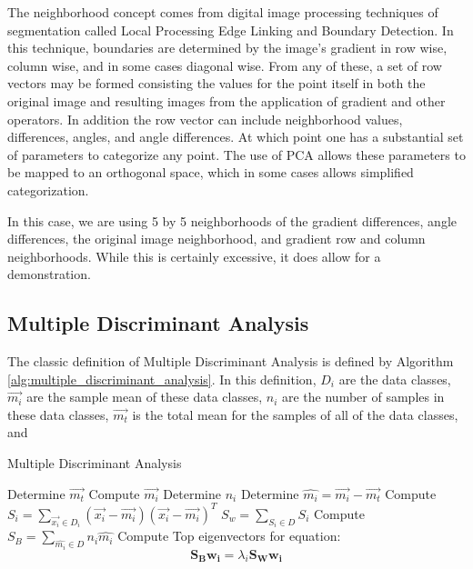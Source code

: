 \documentclass[12pt]{report}
\begin{document}
The neighborhood concept comes from digital image processing techniques of segmentation called Local Processing Edge Linking and Boundary Detection.   In this technique, boundaries are determined by the image's gradient in row wise, column wise, and in some cases diagonal wise.  From any of these, a set of row vectors may be formed consisting the values for the point itself in both the original image and resulting images from the application of gradient and other operators.  In addition the row vector can include neighborhood values, differences, angles, and angle differences.  At which point one has a substantial set of parameters to categorize any point.  The use of PCA allows these parameters to be mapped to an orthogonal space, which in some cases allows simplified categorization.  


In this case, we are using 5 by 5 neighborhoods of the gradient differences, angle differences, the original image neighborhood, and gradient row and column neighborhoods.   While this is certainly excessive, it does allow for a demonstration.   


\subsection{Multiple Discriminant Analysis}

The classic definition of Multiple Discriminant Analysis is defined by Algorithm \ref{alg:multiple_discriminant_analysis}.  In this definition, $D_i$ are the data classes, $\vec{m_i}$ are the sample mean of these data classes, $n_i$ are the number of samples in these data classes, $\vec{m_t}$ is the total mean for the samples of all of the data classes, and 

\begin{algorithm}
\caption{Multiple Discriminant Analysis}
\label{alg:multiple_discriminant_analysis}
\begin{algorithmic}
	\STATE Determine $\vec{m_t}$
		\STATE Compute $\vec{m_i}$
		\STATE Determine $n_i$
		\STATE Determine $\hat{m_i} = \vec{m_i} - \vec{m_t}$
		\STATE Compute $S_i = \sum_{\vec{x_i} \in D_i} (\vec{x_i} - \vec{m_i} )(\vec{x_i} - \vec{m_i} )^T $
	\ENDFOR
	\STATE $S_w = \sum _{S_i \in D} S_i$
	\STATE Compute $S_B = \sum_{\hat{m_i} \in D} n_i \hat{m_i}$
	\STATE Compute Top eigenvectors for equation: 
	\[
	\mathbf{S_B} \mathbf{w_i} = \lambda_i \mathbf{S_W} \mathbf{w_i}
	\]
\end{algorithmic}
\end{algorithm}
\end{document}
